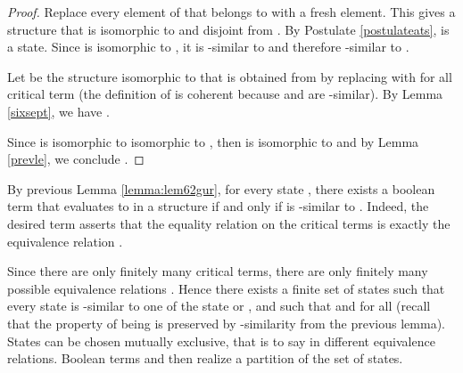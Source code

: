 \documentclass[envcountsame]{llncs}
\begin{document}
\begin{proof}
Replace every element of  that
belongs to  with a fresh element. This gives a structure  that
is isomorphic to  and disjoint from . By Postulate
\ref{postulateats},  is a state. Since  is isomorphic to ,
it is -similar to  and therefore -similar to .

Let  be the structure isomorphic to  that is obtained
from  by replacing  with  for all critical
term  (the definition of  is coherent because  and  are
-similar). By Lemma \ref{sixsept}, we have .

Since  is isomorphic to  isomorphic to , then  is isomorphic to 
and by Lemma \ref{prevle}, we conclude .
\end{proof}



By previous Lemma \ref{lemma:lem62gur}, for every state , there exists a boolean term  that
evaluates to  in a structure  if and only if  is
-similar to . Indeed, the desired term asserts that the equality
relation on the critical terms is exactly the equivalence relation
.

Since there are only finitely many critical terms, there are
only finitely many possible equivalence relations . Hence there
exists a finite set  of states such that every
state is -similar to one of the state  or , and such that
  and  for all  (recall that the
property of being  is preserved by -similarity
from the previous lemma).  States   can
be chosen mutually exclusive, that is to say in different equivalence
relations. Boolean terms  and   then realize a partition of the
set of states.
\end{document}
